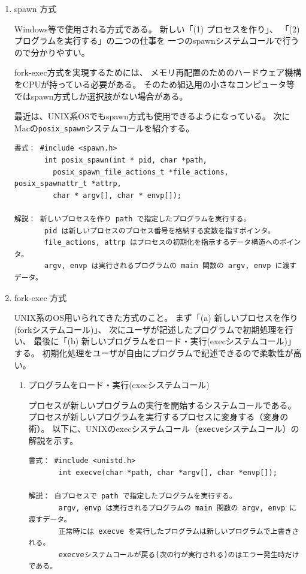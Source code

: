 \documentclass[a4j,dvipdfmx]{jarticle}
\begin{document}
\begin{enumerate}

\item spawn 方式

Windows等で使用される方式である。
新しい「(1) プロセスを作り」、
「(2) プログラムを実行する」の二つの仕事を
一つのspawnシステムコールで行うので分かりやすい。

fork-exec方式を実現するためには、
メモリ再配置のためのハードウェア機構をCPUが持っている必要がある。
そのため組込用の小さなコンピュータ等ではspawn方式しか選択肢がない場合がある。

最近は、UNIX系OSでもspawn方式も使用できるようになっている。
次にMacの\verb/posix_spawn/システムコールを紹介する。

\begin{lstlisting}[numbers=none]
書式： #include <spawn.h>
       int posix_spawn(int * pid, char *path,
         posix_spawn_file_actions_t *file_actions,  posix_spawnattr_t *attrp,
         char * argv[], char * envp[]);

解説： 新しいプロセスを作り path で指定したプログラムを実行する。
       pid は新しいプロセスのプロセス番号を格納する変数を指すポインタ。
       file_actions, attrp はプロセスの初期化を指示するデータ構造へのポインタ。
       argv, envp は実行されるプログラムの main 関数の argv, envp に渡すデータ。
\end{lstlisting}


\item fork-exec 方式

UNIX系のOS用いられてきた方式のこと。
まず「(a) 新しいプロセスを作り(forkシステムコール)」、
次にユーザが記述したプログラムで初期処理を行い、
最後に「(b) 新しいプログラムをロード・実行(execシステムコール)」する。
初期化処理をユーザが自由にプログラムで記述できるので柔軟性が高い。

\begin{enumerate}
\item プログラムをロード・実行(execシステムコール)

プロセスが新しいプログラムの実行を開始するシステムコールである。
プロセスが新しいプログラムを実行するプロセスに変身する（変身の術）。
以下に、UNIXのexecシステムコール（\verb/execve/システムコール）の解説を示す。

\begin{lstlisting}[numbers=none]
書式： #include <unistd.h>
       int execve(char *path, char *argv[], char *envp[]);

解説： 自プロセスで path で指定したプログラムを実行する。
       argv, envp は実行されるプログラムの main 関数の argv, envp に渡すデータ。
       正常時には execve を実行したプログラムは新しいプログラムで上書きされる。
       execveシステムコールが戻る(次の行が実行される)のはエラー発生時だけである。
\end{lstlisting}



\end{enumerate}
\end{enumerate}
\end{document}
